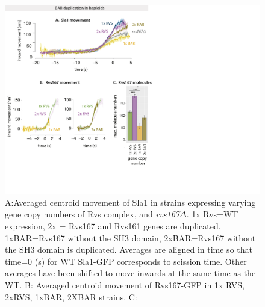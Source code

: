 		\begin{figure}[H]
		\centering
		\includegraphics[width=25cm,height=25 cm,keepaspectratio]{figures/results_final/scaffolding_overlaid2}
		\caption [Progression of invagination with increasing BAR recruitment]
		{A:Averaged centroid movement of Sla1 in strains expressing varying gene copy numbers of Rvs complex, and \textit{rvs167$\Delta$}. 1x Rvs=WT expression, 2x = Rvs167 and Rvs161 genes are duplicated. 1xBAR=Rvs167 without the SH3 domain, 2xBAR=Rvs167 without the SH3 domain is duplicated. Averages are aligned in time so that time=0 (s) for WT Sla1-GFP corresponds to scission time. Other averages have been shifted to move inwards at the same time as the WT.
		B: Averaged centroid movement of Rvs167-GFP in 1x RVS, 2xRVS, 1xBAR, 2XBAR strains.
		C:  }
		\label{fig_scaffold}
		\end{figure}


